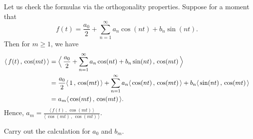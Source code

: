 Let us check the formulas via the orthogonality properties.  Suppose for
a moment that
\begin{equation*}
f(t) = \frac{a_0}{2} + \sum_{n=1}^\infty a_n \cos (n t) + b_n
\sin (n t) .
\end{equation*}
Then for $m \geq 1$, we have
\begin{equation*}
\begin{split}
\langle \, f(t)\,,\,\cos (mt) \, \rangle
& =
\Bigl\langle \, \frac{a_0}{2} + \sum_{n=1}^\infty a_n \cos (n t) + b_n
\sin (n t) \,,\, \cos (mt) \, \Bigr\rangle \\
& =
\frac{a_0}{2}
\langle \, 1 \, , \, \cos (mt) \, \rangle
+ \sum_{n=1}^\infty
a_n \langle \, \cos (nt) \, , \, \cos (mt) \, \rangle +
b_n \langle \, \sin (n t) \, , \, \cos (mt) \, \rangle \\
& =
a_m \langle \, \cos (mt) \, , \, \cos (mt) \, \rangle .
\end{split}
\end{equation*}
Hence,
$a_m =
\frac{\langle \, f(t) \, , \, \cos (mt) \, \rangle}{\langle \, \cos (mt) \, , \,
\cos (mt) \, \rangle}$.

\begin{exercise}
Carry out the calculation for $a_0$ and $b_m$.
\end{exercise}

